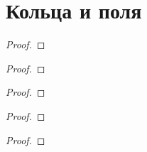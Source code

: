 \documentclass[../main/document.tex]{subfiles}
\begin{document}
\section{Кольца и поля}
\begin{dfn}
\end{dfn}
\begin{thm}
\begin{proof}

\end{proof}
\end{thm}
\begin{cnsq}
\end{cnsq}
\begin{dfn}
\end{dfn}
\begin{dfn}
\end{dfn}
\begin{thm}
\begin{proof}

\end{proof}
\end{thm}
\begin{dfn}
\end{dfn}
\begin{thm}
\begin{proof}

\end{proof}
\end{thm}
\begin{thm}
\begin{proof}

\end{proof}
\end{thm}
\begin{dfn}
\end{dfn}
\begin{thm}
\begin{proof}

\end{proof}
\end{thm}
\begin{dfn}
\end{dfn}
\end{document}
